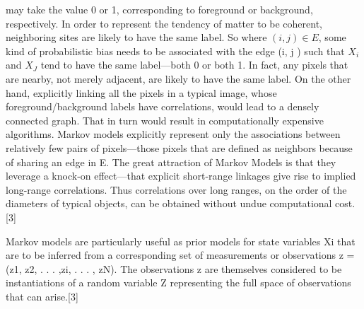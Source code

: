 may take the value 0 or 1, corresponding to foreground or background, respectively. In order
to represent the tendency of matter to be coherent, neighboring sites are likely to have the
same label. So where $(i, j) \in E$, some kind of probabilistic bias needs to be associated with
the edge (i, j ) such that $X_i$ and $X_J$ tend to have the same label—both 0 or both 1. In fact, any
pixels that are nearby, not merely adjacent, are likely to have the same label. On the other
hand, explicitly linking all the pixels in a typical image, whose foreground/background
labels have correlations, would lead to a densely connected graph. That in turn would
result in computationally expensive algorithms. Markov models explicitly represent only
the associations between relatively few pairs of pixels—those pixels that are defined as
neighbors because of sharing an edge in E. The great attraction of Markov Models is that
they leverage a knock-on effect—that explicit short-range linkages give rise to implied
long-range correlations. Thus correlations over long ranges, on the order of the diameters of typical objects, can be obtained without undue computational cost.[3]

Markov models are particularly useful as prior models for state variables Xi that are to
be inferred from a corresponding set of measurements or observations z = (z1, z2, . . . ,zi, . . . , zN). The observations z are themselves considered to be instantiations of a random variable Z representing the full space of observations that can arise.[3]